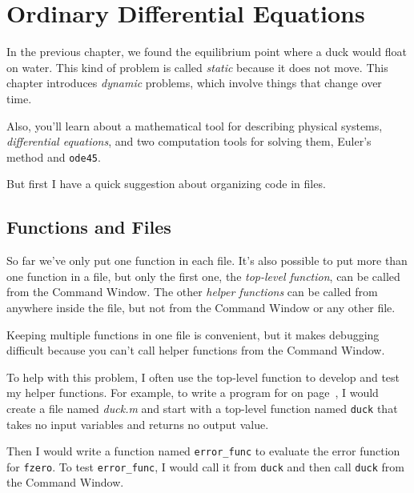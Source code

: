 \chapter{Ordinary Differential Equations}

In the previous chapter, we found the equilibrium point where a duck would float on water.  This kind of problem is called \emph{static} because it does not move.  This chapter introduces \emph{dynamic} problems, which involve things that change over time.
 
Also, you'll learn about a mathematical tool for describing physical systems, \emph{differential equations}, and two computation tools for solving them, Euler's method and \lstinline{ode45}.

But first I have a quick suggestion about organizing code in files.

\section{Functions and Files}
\label{funfiles}

So far we've only put one function in each file.  It's also possible
to put more than one function in a file, but only the first one, the
\emph{top-level function}, can be called from the Command
Window.  The other \emph{helper functions} can be called from anywhere inside the file, but not from the Command Window or any other file.


Keeping multiple functions in one file is convenient, but it makes debugging
difficult because you can't call helper functions from the Command
Window.

To help with this problem, I often use the top-level function
to develop and test my helper functions.  For example, to write
a program for  on page~\pageref{duck}, I would create a file named
\emph{duck.m} and start with a top-level function named \lstinline{duck}
that takes no input variables and returns no output value.

Then I would write a function named \lstinline{error_func} to
evaluate the error function for \lstinline{fzero}.  To test
\lstinline{error_func}, I would call it from \lstinline{duck} and then
call \lstinline{duck} from the Command Window.


